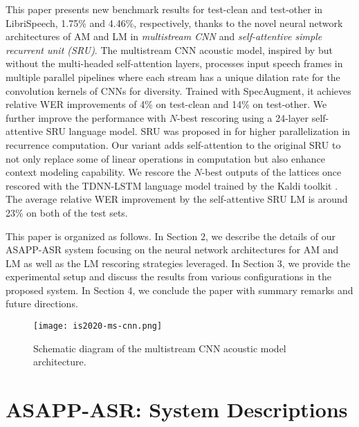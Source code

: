\documentclass[a4paper]{article}
\begin{document}
This paper presents new benchmark results for test-clean and test-other in LibriSpeech, 1.75\% and 4.46\%, respectively, thanks to the novel neural network architectures of AM and LM in \textit{multistream CNN} \cite{han20} and \textit{self-attentive simple recurrent unit (SRU)}. 
The multistream CNN acoustic model, inspired by \cite{han19-2} but without the multi-headed self-attention layers, processes input speech frames in multiple parallel pipelines where each stream has a unique dilation rate for the convolution kernels of CNNs for diversity. Trained with SpecAugment, it achieves relative WER improvements of 4\% on test-clean and 14\% on test-other. We further improve the performance with $N$-best rescoring using a 24-layer self-attentive SRU language model. SRU was proposed in \cite{lei18} for higher parallelization in recurrence computation. Our variant adds self-attention to the original SRU to not only replace some of linear operations in computation but also enhance context modeling capability. We rescore the $N$-best outputs of the lattices once rescored with the TDNN-LSTM language model trained by the Kaldi toolkit \cite{Povey11,Li2018}. The average relative WER improvement by the self-attentive SRU LM is around 23\% on both of the test sets. 

This paper is organized as follows. In Section 2, we describe the details of our ASAPP-ASR system focusing on the neural network architectures for AM and LM as well as the LM rescoring strategies leveraged. In Section 3, we provide the experimental setup and discuss the results from various configurations in the proposed system. In Section 4, we conclude the paper with summary remarks and future directions.

\begin{figure}[t]
  \centering
  \texttt{[image: is2020-ms-cnn.png]}
  \caption{Schematic diagram of the multistream CNN acoustic model architecture.}
  \label{fig:speech_production}
\end{figure}


\section{ASAPP-ASR: System Descriptions}
\end{document}
